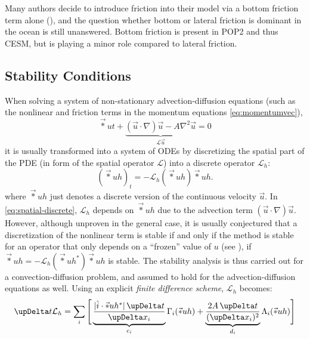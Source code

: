 Many authors decide to introduce friction into their model via a bottom friction term alone (\eg \cite{kawase}), and the question whether bottom or lateral friction is dominant in the ocean is still unanswered. Bottom friction is present in \ac{POP2} and thus \ac{CESM}, but is playing a minor role compared to lateral friction.

\subsection{Stability Conditions}
\label{sec:cfl}
When %
%
solving a system of non-stationary advection-diffusion equations (such as the nonlinear and friction terms in the momentum equations \eqref{eq:momentumvec}), \ie 
%
\begin{equation}
\vec*{u}{t} + \underbrace{(\vec{u}\cdot\nabla)\vec{u} - A \nabla^2 \vec{u}}_{\mathcal{L}\vec{u}} = 0
\end{equation}
%
it is usually transformed into a system of \acp{ODE} by discretizing the spatial part of the \ac{PDE} (in form of the spatial operator \(\mathcal{L}\)) into a discrete operator \(\mathcal{L}_h\):
%
\begin{equation}
(\vec*{u}{h})_t = - \mathcal{L}_h(\vec*{u}{h}) \vec*{u}{h}. \label{eq:spatial-discrete}
\end{equation}
%
where \(\vec*{u}{h}\) just denotes a discrete version of the continuous velocity \(\vec{u}\). In \eqref{eq:spatial-discrete}, \(\mathcal{L}_h\) depends on \(\vec*{u}{h}\) due to the advection term \((\vec{u}\cdot\nabla)\vec{u}\). However, although unproven in the general case, it is usually conjectured that a discretization of the nonlinear term is stable if and only if the method is stable for an operator that only depends on a \enquote{frozen} value of \(u\) (see \eg \cite{chorin}), \ie if \(\vec*{u}{h} = - \mathcal{L}_h(\vec*{u}{h}^*)\vec*{u}{h}\) is stable. The stability analysis is thus carried out for a convection-diffusion problem, and assumed to hold for the advection-diffusion equations as well. Using an explicit \emph{finite difference scheme}, \(\mathcal{L}_h\) becomes:
%
\begin{equation}
\updel t \mathcal{L}_h = \sum_i \Bigg[ \underbrace{\frac{|\hat{i} \cdot \vec*{u}{h}^*| \updel t}{\updel x_i}}_{c_i} \Gamma_i(\vec*{u}{h}) + \underbrace{\frac{2A\updel t}{(\updel x_i)^2}}_{d_i} \Lambda_i(\vec*{u}{h}) \Bigg]
\end{equation}
